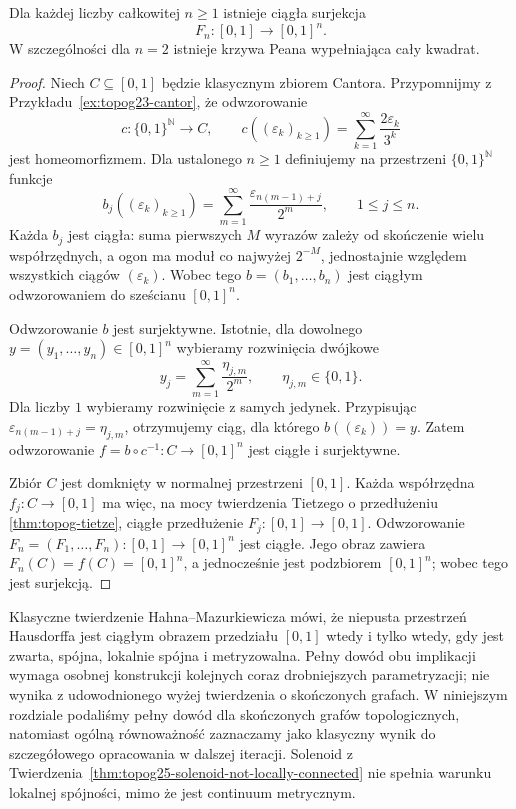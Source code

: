 \begin{twierdzenie}
\label{thm:topog25-space-filling}
Dla każdej liczby całkowitej \(n\ge1\)
istnieje ciągła surjekcja
\[
 F_n\colon[0,1]\longrightarrow[0,1]^n.
\]
W szczególności dla \(n=2\)
istnieje krzywa Peana wypełniająca
cały kwadrat.
\end{twierdzenie}
\begin{proof}
Niech \(C\subseteq[0,1]\)
będzie klasycznym zbiorem Cantora.
Przypomnijmy z
Przykładu~\ref{ex:topog23-cantor},
że odwzorowanie
\[
 c\colon\{0,1\}^{\mathbb N}\longrightarrow C,
 \qquad c((\varepsilon_k)_{k\ge1})
 =\sum_{k=1}^{\infty}\frac{2\varepsilon_k}{3^k}
\]
jest homeomorfizmem.
Dla ustalonego \(n\ge1\)
definiujemy na przestrzeni
\(\{0,1\}^{\mathbb N}\)
funkcje
\[
 b_j((\varepsilon_k)_{k\ge1})
 =\sum_{m=1}^{\infty}
 \frac{\varepsilon_{n(m-1)+j}}{2^m},
 \qquad 1\le j\le n.
\]
Każda \(b_j\) jest ciągła:
suma pierwszych \(M\) wyrazów
zależy od skończenie wielu
współrzędnych, a ogon ma moduł
co najwyżej \(2^{-M}\),
jednostajnie względem wszystkich
ciągów \((\varepsilon_k)\).
Wobec tego
\(b=(b_1,\ldots,b_n)\)
jest ciągłym odwzorowaniem
do sześcianu \([0,1]^n\).

Odwzorowanie \(b\) jest surjektywne.
Istotnie, dla dowolnego
\(y=(y_1,\ldots,y_n)\in[0,1]^n\)
wybieramy rozwinięcia dwójkowe
\[
 y_j=\sum_{m=1}^{\infty}
       \frac{\eta_{j,m}}{2^m},
 \qquad \eta_{j,m}\in\{0,1\}.
\]
Dla liczby \(1\) wybieramy
rozwinięcie z samych jedynek.
Przypisując
\(\varepsilon_{n(m-1)+j}=\eta_{j,m}\),
otrzymujemy ciąg, dla którego
\(b((\varepsilon_k))=y\).
Zatem odwzorowanie
\(f=b\circ c^{-1}\colon C\to[0,1]^n\)
jest ciągłe i surjektywne.

Zbiór \(C\) jest domknięty
w normalnej przestrzeni \([0,1]\).
Każda współrzędna \(f_j\colon C\to[0,1]\)
ma więc, na mocy
twierdzenia Tietzego o przedłużeniu
\ref{thm:topog-tietze},
ciągłe przedłużenie
\(F_j\colon[0,1]\to[0,1]\).
Odwzorowanie
\(F_n=(F_1,\ldots,F_n)\colon[0,1]\to[0,1]^n\)
jest ciągłe.
Jego obraz zawiera \(F_n(C)=f(C)=[0,1]^n\),
a jednocześnie jest podzbiorem \([0,1]^n\);
wobec tego jest surjekcją.
\end{proof}

\begin{uwaga}
\label{rem:topog25-hahn-mazurkiewicz}
Klasyczne twierdzenie Hahna--Mazurkiewicza
mówi, że niepusta przestrzeń Hausdorffa
jest ciągłym obrazem przedziału \([0,1]\)
wtedy i tylko wtedy, gdy jest
zwarta, spójna, lokalnie spójna
i metryzowalna.
Pełny dowód obu implikacji
wymaga osobnej konstrukcji
kolejnych coraz drobniejszych
parametryzacji; nie wynika
z udowodnionego wyżej
twierdzenia o skończonych grafach.
W niniejszym rozdziale
podaliśmy pełny dowód
dla skończonych grafów topologicznych,
natomiast ogólną równoważność
zaznaczamy jako klasyczny
wynik do szczegółowego opracowania
w dalszej iteracji.
Solenoid z
Twierdzenia~\ref{thm:topog25-solenoid-not-locally-connected}
nie spełnia warunku lokalnej spójności,
mimo że jest continuum metrycznym.
\end{uwaga}


